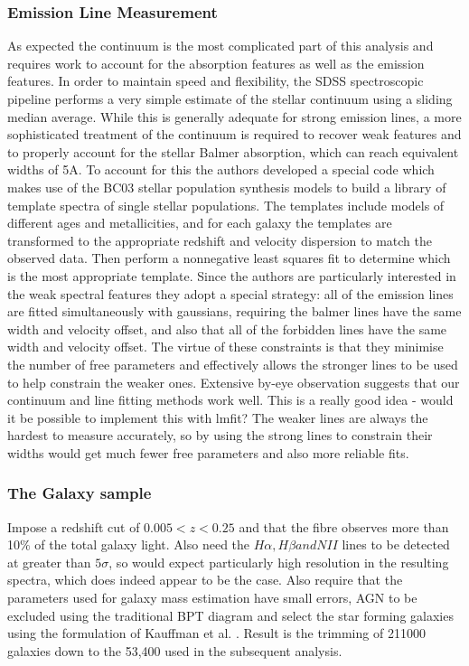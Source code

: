 \documentclass{literature}
\begin{document}
\subsubsection{Emission Line Measurement}
As expected the continuum is the most complicated part of this analysis and requires work to account for the absorption features as well as the emission features. In order to maintain speed and flexibility, the SDSS spectroscopic pipeline performs a very simple estimate of the stellar continuum using a sliding median average. While this is generally adequate for strong emission lines, a more sophisticated treatment of the continuum is required to recover weak features and to properly account for the stellar Balmer absorption, which can reach equivalent widths of 5A. To account for this the authors developed a special code which makes use of the BC03 \citep{Bruzual_2003} stellar population synthesis models to build a library of template spectra of single stellar populations. The templates include models of different ages and metallicities, and for each galaxy the templates are transformed to the appropriate redshift and velocity dispersion to match the observed data. Then perform a nonnegative least squares fit to determine which is the most appropriate template. Since the authors are particularly interested in the weak spectral features they adopt a special strategy: all of the emission lines are fitted simultaneously with gaussians, requiring the balmer lines have the same width and velocity offset, and also that all of the forbidden lines have the same width and velocity offset. The virtue of these constraints is that they minimise the number of free parameters and effectively allows the stronger lines to be used to help constrain the weaker ones. Extensive by-eye observation suggests that our continuum and line fitting methods work well. This is a really good idea - would it be possible to implement this with lmfit? The weaker lines are always the hardest to measure accurately, so by using the strong lines to constrain their widths would get much fewer free parameters and also more reliable fits. 

\subsubsection{The Galaxy sample}
Impose a redshift cut of $0.005 < z < 0.25$ and that the fibre observes more than 10$\%$ of the total galaxy light. Also need the $H\alpha, H\beta and NII$ lines to be detected at greater than $5\sigma$, so would expect particularly high resolution in the resulting spectra, which does indeed appear to be the case. Also require that the parameters used for galaxy mass estimation have small errors, AGN to be excluded using the traditional BPT diagram and select the star forming galaxies using the formulation of Kauffman et al. \citep{Kauffman_2003}. Result is the trimming of 211000 galaxies down to the 53,400 used in the subsequent analysis. 
\end{document}
